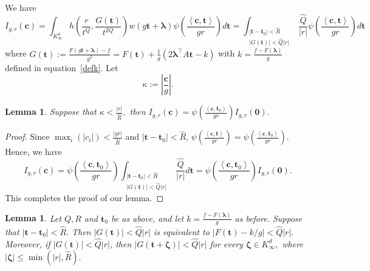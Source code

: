 \documentclass[10pt]{amsart}
\theoremstyle{plain}
\theoremstyle{plain}
\newtheorem{lemma}[theorem]{Lemma}
\renewcommand{\vec}[1]{\mathbf{#1}}
\theoremstyle{remark}
\theoremstyle{definition}
\newcommand{\Ki}{K_\infty}
\newcommand{\hQ}{\widehat{Q}}
\newcommand{\hR}{\widehat{R}}
\begin{document}
  We have  
\begin{equation}\label{intt}
I_{g,r}(\vec{c})= \int_{\Ki^d} h\left(\frac{r}{t^Q},\frac{G(\vec{t})}{t^{2Q}}\right) w(g\vec{t}+\boldsymbol{\lambda}) \psi\left(\frac{\left< \vec{c},\vec{t} \right>}{gr}    \right) d\vec{t}= \int_{\substack{|\vec{t}-\vec{t}_0| < \hR \\ |G(\vec{t})|< \hQ|r|}} \frac{\hQ}{|r|}  \psi\left(\frac{\left< \vec{c},\vec{t} \right>}{gr}    \right) d\vec{t}
\end{equation}
where $G(\vec{t}):=\frac{F(g\vec{t}+\boldsymbol{\lambda})-f}{g^2}=F(\vec{t})+\frac{1}{g}(2\boldsymbol{\lambda}^{\intercal} A\vec{t}-k)$ with $k=\frac{f-F(\boldsymbol{\lambda})}{g}$ defined in equation~\eqref{defk}.
 Let  \begin{equation}
 \label{kappadef}
 \kappa:=\left|\frac{\vec{c}}{g }\right|.
 \end{equation}
\begin{lemma}\label{noosc}
Suppose that $\kappa< \frac{|r|}{\hR},$ then  $I_{g,r}(\vec{c})= \psi\left(\frac{\left< \vec{c},\vec{t}_0 \right>}{gr}    \right) I_{g,r}(\vec{0}).$
\end{lemma}
\begin{proof}
Since $\max_{i}(|c_i|)< \frac{|gr|}{\hR}$ and $|\vec{t}-\vec{t}_0|<\hR$,  $ \psi\left(\frac{\left< \vec{c},\vec{t} \right>}{gr}    \right)=\psi\left(\frac{\left< \vec{c},\vec{t}_0 \right>}{gr}    \right).$ 
Hence, we have 
\[
I_{g,r}(\vec{c})=\psi\left(\frac{\left< \vec{c},\vec{t}_0 \right>}{gr}    \right) \int_{\substack{|\vec{t}-\vec{t}_0| < \hR \\ |G(\vec{t})|< \hQ|r|}} \frac{\hQ}{|r|}   d\vec{t}= \psi\left(\frac{\left< \vec{c},\vec{t}_0 \right>}{gr}    \right) I_{g,r}(\vec{0}).
\]
This completes the proof of our lemma. 
\end{proof}
\begin{lemma}\label{auxlem}
Let $Q, R$ and $\vec{t}_0$ be as above, and let $k=\frac{f-F(\boldsymbol{\lambda})}{g}$ as before. Suppose that $|\vec{t}-\vec{t}_0|< \hR.$ Then $|G(\vec{t})| < \hQ|r|$ is equivalent to $|F(\vec{t})-k/g|<\hQ |r|.$ Moreover, if $|G(\vec{t})|< \hQ|r|$, then $|G(\vec{t}+\boldsymbol{\zeta})|  < \hQ|r|$ for every $\boldsymbol{\zeta}\in K_\infty^d,$ where $|\boldsymbol{\zeta}| \leq \min(|r|,\hR).$
\end{lemma}
\end{document}
